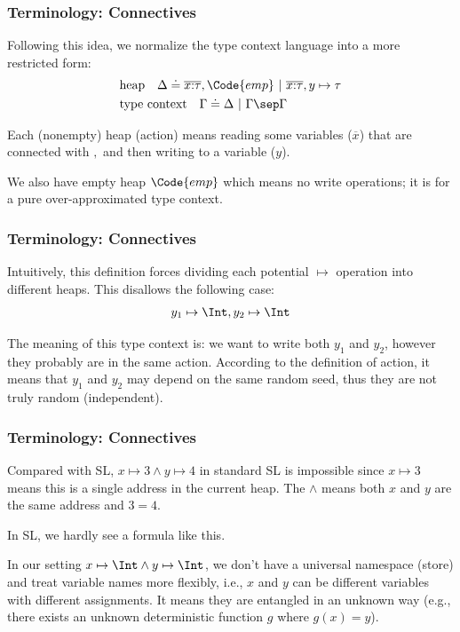 \begin{frame}
    \frametitle{Terminology: Connectives}
    
Following this idea, we normalize the type context language into a more restricted form:
\begin{align*}
    &\text{heap} \quad \Delta \doteq \overline{x{:}\tau},\Code{emp} ~|~ \overline{x{:}\tau}, y\mapsto \tau
    \\&\text{type context} \quad \Gamma \doteq \Delta ~|~ \Gamma \sep \Gamma
\end{align*}

Each (nonempty) heap (action) means reading some variables ($\overline{x}$) that are connected with $,$ and then writing to a variable ($y$). 

We also have empty heap $\Code{emp}$ which means no write operations; it is for a pure over-approximated type context.

\end{frame}

\begin{frame}
    \frametitle{Terminology: Connectives}
    
Intuitively, this definition forces dividing each potential $\mapsto$ operation into different heaps. This disallows the following case:
\begin{align*}
    y_1 \mapsto \Int, y_2 \mapsto \Int
\end{align*}

The meaning of this type context is: we want to write both $y_1$ and $y_2$, however they probably are in the same action. According to the definition of action, it means that $y_1$ and $y_2$ may depend on the same random seed, thus they are not truly random (independent).

\end{frame}

\begin{frame}
    \frametitle{Terminology: Connectives}
    
Compared with SL, $x \mapsto 3 \land y \mapsto 4$ in standard SL is impossible since $x \mapsto 3$ means this is a single address in the current heap. The $\land$ means both $x$ and $y$ are the same address and $3 = 4$.

In SL, we hardly see a formula like this.

In our setting $x \mapsto \Int \land y \mapsto \Int$, we don't have a universal namespace (store) and treat variable names more flexibly, i.e., $x$ and $y$ can be different variables with different assignments. It means they are entangled in an unknown way (e.g., there exists an unknown deterministic function $g$ where $g(x) = y$).

\end{frame}

